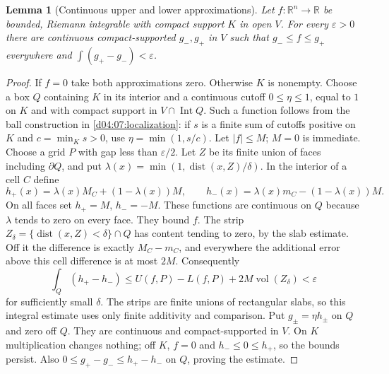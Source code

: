 \documentclass[11pt,oneside,openany]{book}
\newtheorem{lemma}[theorem]{Lemma}
\theoremstyle{definition}
\theoremstyle{remark}
\newcommand{\R}{\mathbb R}
\newcommand{\eps}{\varepsilon}
\DeclareMathOperator{\vol}{vol}
\DeclareMathOperator{\dist}{dist}
\DeclareMathOperator{\Int}{Int}
\begin{document}
\begin{lemma}[Continuous upper and lower approximations]\label{d04:07:sandwich}
Let $f:\R^n\to\R$ be bounded, Riemann integrable with compact support $K$ in open $V$. For every $\eps>0$ there are continuous compact-supported $g_-,g_+$ in $V$ such that $g_-\leq f\leq g_+$ everywhere and $\int(g_+-g_-)<\eps$.
\end{lemma}
\begin{proof}
If $f=0$ take both approximations zero. Otherwise $K$ is nonempty. Choose a box $Q$ containing $K$ in its interior and a continuous cutoff $0\leq\eta\leq1$, equal to $1$ on $K$ and with compact support in $V\cap\Int Q$. Such a function follows from the ball construction in \cref{d04:07:localization}: if $s$ is a finite sum of cutoffs positive on $K$ and $c=\min_Ks>0$, use $\eta=\min(1,s/c)$.
Let $|f|\leq M$; $M=0$ is immediate. Choose a grid $P$ with gap less than $\eps/2$. Let $Z$ be its finite union of faces including $\partial Q$, and put $\lambda(x)=\min(1,\dist(x,Z)/\delta)$. In the interior of a cell $C$ define
\[
 h_+(x)=\lambda(x)M_C+(1-\lambda(x))M,
 \qquad h_-(x)=\lambda(x)m_C-(1-\lambda(x))M.
\]
On all faces set $h_+=M$, $h_-=-M$. These functions are continuous on $Q$ because $\lambda$ tends to zero on every face. They bound $f$. The strip $Z_\delta=\{\dist(x,Z)<\delta\}\cap Q$ has content tending to zero, by the slab estimate. Off it the difference is exactly $M_C-m_C$, and everywhere the additional error above this cell difference is at most $2M$. Consequently
\[
 \int_Q(h_+-h_-)\leq U(f,P)-L(f,P)+2M\vol(Z_\delta)<\eps
\]
for sufficiently small $\delta$. The strips are finite unions of rectangular slabs, so this integral estimate uses only finite additivity and comparison. Put $g_\pm=\eta h_\pm$ on $Q$ and zero off $Q$. They are continuous and compact-supported in $V$. On $K$ multiplication changes nothing; off $K$, $f=0$ and $h_-\leq0\leq h_+$, so the bounds persist. Also $0\leq g_+-g_-\leq h_+-h_-$ on $Q$, proving the estimate.
\end{proof}
\end{document}
